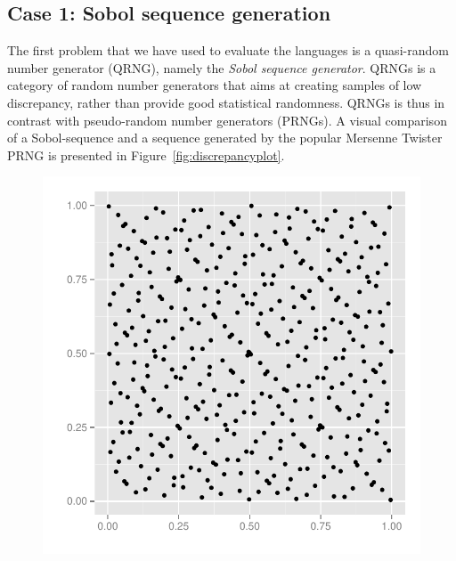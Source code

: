\documentclass[preprint]{sigplanconf}
\begin{document}
\subsection{Case 1: Sobol sequence generation}
The first problem that we have used to evaluate the languages is a
quasi-random number generator (QRNG), namely the \emph{Sobol sequence
  generator}. QRNGs is a category of random number generators that
aims at creating samples of low discrepancy, rather than provide good
statistical randomness. QRNGs is thus in contrast with pseudo-random
number generators (PRNGs). A visual comparison of a Sobol-sequence and
a sequence generated by the popular Mersenne Twister PRNG is presented
in Figure~\ref{fig:discrepancyplot}.
\begin{figure}
  \centering
  \begin{minipage}{0.45\linewidth}
    \begin{center}
      \includegraphics[width=\textwidth]{../report/graphics/2D-sobol-sequence.pdf}


\end{center}
\end{minipage}
\end{figure}
\end{document}
